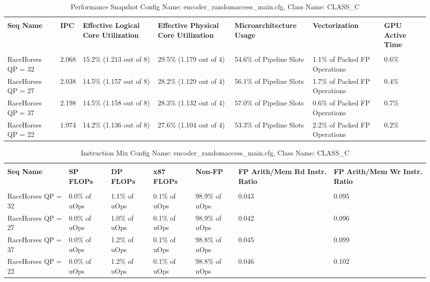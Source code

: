 \documentclass{article}%
\begin{document}
\begin{longtabu}{| X[l] | X[l] | X[l] | X[l] | X[l] | X[l] | X[l] |}%
\caption{%
Performance Snapshot\newline%
 Config Name: encoder\_randomaccess\_main.cfg,\newline%
 Class Name: CLASS\_C\newline%
%
}%
\hline%
&&&&&&\\%
\textbf{Seq Name}&\textbf{IPC}&\textbf{Effective Logical Core Utilization}&\textbf{Effective Physical Core Utilization}&\textbf{Microarchitecture Usage}&\textbf{Vectorization}&\textbf{GPU Active Time}\\%
&&&&&&\\%
\hline%
\endhead%
RaceHorses\newline%
 QP = 32&2.068&15.2\% (1.213 out of 8)&29.5\% (1.179 out of 4)&54.6\% of Pipeline Slots&1.1\% of Packed FP Operations&0.6\%\\%
\hline%
RaceHorses\newline%
 QP = 27&2.038&14.5\% (1.157 out of 8)&28.2\% (1.129 out of 4)&56.1\% of Pipeline Slots&1.7\% of Packed FP Operations&0.4\%\\%
\hline%
RaceHorses\newline%
 QP = 37&2.198&14.5\% (1.158 out of 8)&28.3\% (1.132 out of 4)&57.0\% of Pipeline Slots&0.6\% of Packed FP Operations&0.7\%\\%
\hline%
RaceHorses\newline%
 QP = 22&1.974&14.2\% (1.136 out of 8)&27.6\% (1.104 out of 4)&53.3\% of Pipeline Slots&2.2\% of Packed FP Operations&0.2\%\\%
\hline%
\end{longtabu}%
\begin{longtabu}{| X[l] | X[l] | X[l] | X[l] | X[l] | X[l] | X[l] |}%
\caption{%
Instruction Mix\newline%
 Config Name: encoder\_randomaccess\_main.cfg,\newline%
 Class Name: CLASS\_C\newline%
%
}%
\hline%
&&&&&&\\%
\textbf{Seq Name}&\textbf{SP FLOPs}&\textbf{DP FLOPs}&\textbf{x87 FLOPs}&\textbf{Non{-}FP}&\textbf{FP Arith/Mem Rd Instr. Ratio}&\textbf{FP Arith/Mem Wr Instr. Ratio}\\%
&&&&&&\\%
\hline%
\endhead%
RaceHorses\newline%
 QP = 32&0.0\% of uOps&1.1\% of uOps&0.1\% of uOps&98.9\% of uOps&0.043&0.095\\%
\hline%
RaceHorses\newline%
 QP = 27&0.0\% of uOps&1.0\% of uOps&0.1\% of uOps&98.9\% of uOps&0.042&0.096\\%
\hline%
RaceHorses\newline%
 QP = 37&0.0\% of uOps&1.2\% of uOps&0.1\% of uOps&98.8\% of uOps&0.045&0.099\\%
\hline%
RaceHorses\newline%
 QP = 22&0.0\% of uOps&1.2\% of uOps&0.1\% of uOps&98.8\% of uOps&0.046&0.102\\%
\hline%
\end{longtabu}%
\end{document}
